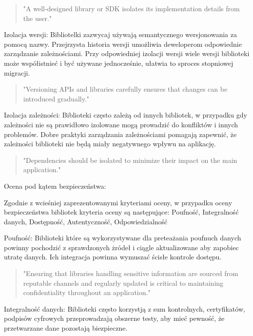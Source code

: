 \documentclass[runningheads,12pt]{llncs}
\begin{document}
\begin{quote}
    "A well-designed library or SDK isolates its implementation details from the user." ~\cite[p. 75]{Essential}
\end{quote}

Izolacja wersji: Bibliotelki zazwycaj używają semantycznego wersjonowania za pomocą nazwy. Przejrzysta historia wersji umożliwia deweloperom odpowiednie zarządzanie zależnościami. Przy odpowiedniej izolacji wersji wiele wersji biblioteki może współistnieć i być używane jednocześnie, ułatwia to sproces stopniowej migracji.

\begin{quote}
    "Versioning APIs and libraries carefully ensures that changes can be introduced gradually." ~\cite[p. 172]{fowler2012patterns}
\end{quote}

Izolacja zależności: Biblioteki często zależą od innych bibliotek, w przypadku gdy zależności nie są prawidłowo izolowane mogą prowadzić do konfliktów i innych problemów. Dobre praktyki zarządzania zależnościami pomagają zapewnić, że zależności biblioteki nie będą miały negatywnego wpływu na aplikację.

\begin{quote}
    "Dependencies should be isolated to minimize their impact on the main application." ~\cite[p. 218]{martin2008clean}
\end{quote}

Ocena pod kątem bezpieczeństwa:

Zgodnie z wcieśniej zaprezentowanymi kryteriami oceny, w przypadku oceny bezpieczeństwa bibliotek kryteria oceny są następujące: Poufność, Integralność danych, Dostępność, Autentyczność, Odpowiedzialność

Poufność: Biblioteki które są wykorzystywane dla preteażania poufnuch danych powinny pochodzić z sprawdzonych żródeł i ciągle aktualizowane aby zapobiec utratę danych. Ich integracja powinna wymuszać ścisłe kontrole dostępu. 

\begin{quote}
    "Ensuring that libraries handling sensitive information are sourced from reputable channels and regularly updated is critical to maintaining confidentiality throughout an application." ~\cite[p. 82]{Essential}
\end{quote}

Integralność danych: Biblioteki często korzystją z sum kontrolnych, certyfikatów, podpisów cyfrowych przeprowadzają obszerne testy, aby mieć pewność, że przetwarzane dane pozostają biezpieczne.
\end{document}
